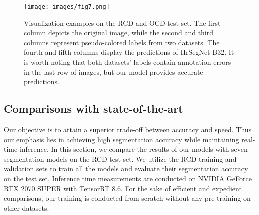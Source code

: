 \documentclass[preprint,12pt,authoryear]{elsarticle}
\begin{document}
\begin{center}
    \begin{figure}[t]
        \centering
        \texttt{[image: images/fig7.png]}
        \caption{Visualization examples on the RCD and OCD test set. The first column depicts the original image, while the second and third columns represent pseudo-colored labels from two datasets. The fourth and fifth columns display the predictions of HrSegNet-B32. It is worth noting that both datasets' labels contain annotation errors in the last row of images, but our model provides accurate predictions.}
        \label{fig:figure7}
    \end{figure}
\end{center}
\subsection{Comparisons with state-of-the-art}

Our objective is to attain a superior trade-off between accuracy and speed. Thus our emphasis lies in achieving high segmentation accuracy while maintaining real-time inference. In this section, we compare the results of our models with seven segmentation models on the RCD test set. We utilize the RCD training and validation sets to train all the models and evaluate their segmentation accuracy on the test set. Inference time measurements are conducted on NVIDIA GeForce RTX 2070 SUPER with TensorRT 8.6. For the sake of efficient and expedient comparisons, our training is conducted from scratch without any pre-training on other datasets.
\end{document}
